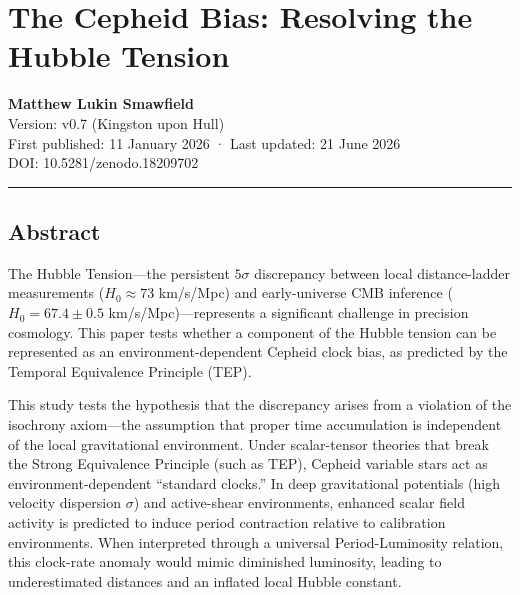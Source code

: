 \documentclass[
]{article}
\author{}
\date{}
\begin{document}
\section{The Cepheid Bias: Resolving the Hubble
Tension}\label{the-cepheid-bias-resolving-the-hubble-tension}

\textbf{Matthew Lukin Smawfield}\\
Version: v0.7 (Kingston upon Hull)\\
First published: 11 January 2026 · Last updated: 21 June 2026\\
DOI: 10.5281/zenodo.18209702

\begin{center}\rule{0.5\linewidth}{0.5pt}\end{center}

\subsection{Abstract}\label{abstract}

The Hubble Tension---the persistent \(5\sigma\) discrepancy between
local distance-ladder measurements (\(H_0 \approx 73\) km/s/Mpc) and
early-universe CMB inference (\(H_0 = 67.4 \pm 0.5\)
km/s/Mpc)---represents a significant challenge in precision cosmology.
This paper tests whether a component of the Hubble tension can be
represented as an environment-dependent Cepheid clock bias, as predicted
by the Temporal Equivalence Principle (TEP).

This study tests the hypothesis that the discrepancy arises from a
violation of the isochrony axiom---the assumption that proper time
accumulation is independent of the local gravitational environment.
Under scalar-tensor theories that break the Strong Equivalence Principle
(such as TEP), Cepheid variable stars act as environment-dependent
``standard clocks.'' In deep gravitational potentials (high velocity
dispersion \(\sigma\)) and active-shear environments, enhanced scalar
field activity is predicted to induce period contraction relative to
calibration environments. When interpreted through a universal
Period-Luminosity relation, this clock-rate anomaly would mimic
diminished luminosity, leading to underestimated distances and an
inflated local Hubble constant.
\end{document}
